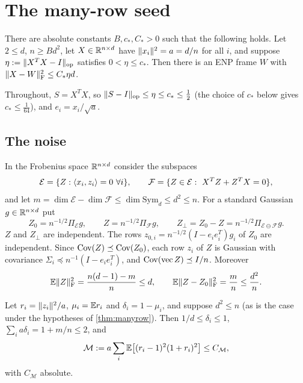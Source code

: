 \section{The many-row seed}\label{sec:manyrow}

\begin{theorem}\label{thm:manyrow}
There are absolute constants $B,c_*,C_*>0$ such that the following holds. Let
$2\le d$, $n\ge Bd^2$, let $X\in\mathbb R^{n\times d}$ have $\lVert x_i\rVert^2=a=d/n$ for all
$i$, and suppose $\eta:=\lVert X^TX-I\rVert_{\mathrm{op}}$ satisfies $0<\eta\le c_*$. Then there is
an ENP frame $W$ with $\lVert X-W\rVert_{\mathrm F}^2\le C_*\eta d$.
\end{theorem}

Throughout, $S=X^TX$, so
$\lVert S-I\rVert_{\mathrm{op}}\le\eta\le c_*\le\frac12$ (the choice of $c_*$ below gives
$c_*\le\frac1{64}$), and
$e_i=x_i/\sqrt a$.

\subsection{The noise}

In the Frobenius space $\mathbb R^{n\times d}$ consider the subspaces
\[
 \mathcal E=\{Z:\langle x_i,z_i\rangle=0\ \forall i\},\qquad
 \mathcal F=\{Z\in\mathcal E:\ X^TZ+Z^TX=0\},
\]
and let $m=\dim\mathcal E-\dim\mathcal F\le\dim\mathrm{Sym}_d\le d^2\le n$. For a
standard Gaussian $g\in\mathbb R^{n\times d}$ put
\[
 Z_0=n^{-1/2}\Pi_{\mathcal E}g,\qquad Z=n^{-1/2}\Pi_{\mathcal F}g,\qquad
 Z_\perp=Z_0-Z=n^{-1/2}\Pi_{\mathcal E\ominus\mathcal F}g .
\]
$Z$ and $Z_\perp$ are independent. The rows $z_{0,i}=n^{-1/2}(I-e_ie_i^T)g_i$
of $Z_0$ are independent. Since $\operatorname{Cov}(Z)\preceq\operatorname{Cov}(Z_0)$, each row $z_i$ of
$Z$ is Gaussian with covariance $\Sigma_i\preceq n^{-1}(I-e_ie_i^T)$, and
$\operatorname{Cov}(\mathrm{vec}\,Z)\preceq I/n$. Moreover
\begin{equation}\label{eq:mr-noise}
 \mathbb E\lVert Z\rVert_{\mathrm F}^2=\frac{n(d-1)-m}{n}\le d,\qquad
 \mathbb E\lVert Z-Z_0\rVert_{\mathrm F}^2=\frac mn\le\frac{d^2}n .
\end{equation}

\begin{lemma}\label{lem:rowmoments}
Let $r_i=\lVert z_i\rVert^2/a$, $\mu_i=\mathbb E r_i$ and $\delta_i=1-\mu_i$, and suppose
$d^2\le n$ (as is the case under the hypotheses of \cref{thm:manyrow}). Then
$1/d\le\delta_i\le1$, $\sum_ia\delta_i=1+m/n\le2$, and
\[
 \mathcal M:=a\sum_i\mathbb E\bigl[(r_i-1)^2(1+r_i)^2\bigr]\le C_{\mathcal M},
\]
with $C_{\mathcal M}$ absolute.
\end{lemma}

